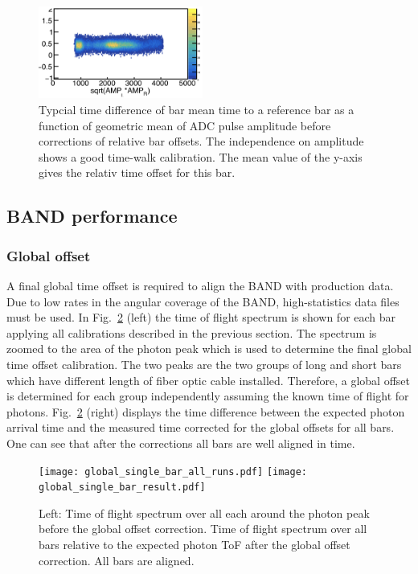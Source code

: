 \documentclass[3p,final,twocolumn]{elsarticle}
\begin{document}
{\begin{figure}[tbh!]
	\centering
		\includegraphics[width=0.48\textwidth]{bar_offset.png}
	\caption{Typcial time difference of bar mean time to a reference bar as a function of geometric mean of ADC pulse amplitude before corrections of relative bar offsets. The independence on amplitude shows a good time-walk calibration. The mean value of the y-axis gives the relativ time offset for this bar.}
	\label{fig:bar_off}
\end{figure}

\subsection{BAND performance} 
\subsubsection{Global offset}
\label{sec:global_offset}
A final global time offset is required to align the BAND with production data. Due to low rates in the angular coverage of the BAND, 
high-statistics data files must be used. 
In Fig.~\ref{fig:final_offset} (left) the time of flight spectrum is shown for each bar applying all calibrations described in the previous section. The spectrum is zoomed to the area of the photon peak which is used to determine the final global time offset calibration. The two peaks are the two groups of long and short bars which have different length of fiber optic cable installed. Therefore, a global offset is determined for each group independently assuming the known time of flight for photons. Fig.~\ref{fig:final_offset} (right) displays the time difference between the expected photon arrival time and the measured time corrected for the global offsets for all bars. One can see that after the corrections all bars are well aligned in time.
\begin{figure}[h!]
	\centering
		\texttt{[image: global\_single\_bar\_all\_runs.pdf]}
		\texttt{[image: global\_single\_bar\_result.pdf]}
	\caption{Left: Time of flight spectrum over all each around the photon peak before the global offset correction. Time of flight spectrum over all bars relative to the expected photon ToF after  the global offset correction. All bars are aligned.}
	\label{fig:final_offset}
\end{figure}

}
\end{document}
